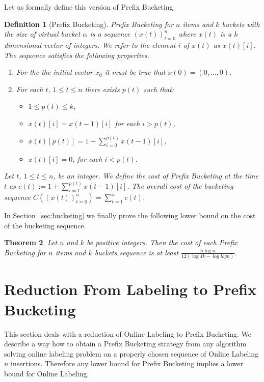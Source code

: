 \documentclass{llncs}
\newtheorem{definition}{Definition} %
\newtheorem{theorem}[definition]{Theorem}
\newcommand{\PB}{Prefix Bucketing}
\begin{document}
Let us formally define this version of Prefix Bucketing.
\begin{definition}[\PB{}]
\emph{\PB{}} for $n$ items and $k$ buckets with the size of virtual bucket $\alpha$ is a sequence $(x(t))_{t = 0}^{n}$ where $x(t)$ is a $k$ dimensional vector of integers. We refer to the element $i$ of $x(t)$ as $x(t)[i]$. The sequence satisfies the following properties.
\begin{enumerate}
	\item[P1)] For the the initial vector $x_0$ it must be true that $x(0) = (0, \dots, 0)$.
	\item[P2)] For each $t$, $1 \leq t \leq n$ there exists $p(t)$ such that:
	\begin{itemize}
		\item $1 \leq p(t) \leq k$,
		\item $x(t)[i] = x(t-1)[i]$ for each $i>p(t)$,
		\item $x(t)[p(t)] = 1+\sum_{i=0}^{p(t)} x({t-1})[i]$,
		\item $x(t)[i] = 0$, for each $i<p(t)$.
	\end{itemize}
\end{enumerate}
Let $t$, $1\leq t \leq n$, be an integer. We define the cost of \PB{} at the time $t$ as $c(t):= 1+\sum_{i=1}^{p(t)} x({t-1})[i]$.
The overall cost of the bucketing sequence $C((x(t))_{t = 0}^n) = \sum_{t=1}^n c(t)$.
\end{definition}

In Section~\ref{sec:bucketing} we finally prove the following lower bound on the cost of the bucketing sequence.
\begin{theorem}
\label{thm:bucketing-lower-bound}
Let $n$ and $k$ be positive integers.
Then the cost of each \PB{} for $n$ items and $k$ buckets sequence is at least $\frac{n \log n}{12(\log 4k - \log log n)}$.
\end{theorem}

\section{Reduction From Labeling to Prefix Bucketing}

This section deals with a reduction of Online Labeling to Prefix Bucketing.
We describe a way how to obtain a Prefix Bucketing strategy from any algorithm solving online labeling problem on a properly chosen sequence of Online Labeling $n$ insertions.
Therefore any lower bound for Prefix Bucketing implies a lower bound for Online Labeling.
\end{document}
